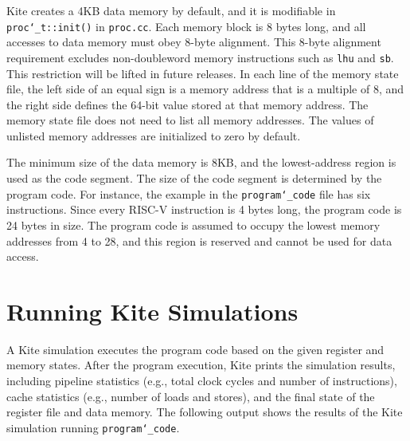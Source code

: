 \documentclass[10pt]{article}
\begin{document}
Kite creates a 4KB data memory by default, and it is modifiable in {\tt\small proc\char`_t::init()} in {\tt\small proc.cc}.
Each memory block is 8 bytes long, and all accesses to data memory must obey 8-byte alignment.
This 8-byte alignment requirement excludes non-doubleword memory instructions such as {\tt\small lhu} and {\tt\small sb}.
This restriction will be lifted in future releases.
In each line of the memory state file, the left side of an equal sign is a memory address that is a multiple of 8, and the right side defines the 64-bit value stored at that memory address.
The memory state file does not need to list all memory addresses.
The values of unlisted memory addresses are initialized to zero by default.

The minimum size of the data memory is 8KB, and the lowest-address region is used as the code segment.
The size of the code segment is determined by the program code.
For instance, the example in the {\tt\small program\char`_code} file has six instructions.
Since every RISC-V instruction is 4 bytes long, the program code is 24 bytes in size.
The program code is assumed to occupy the lowest memory addresses from 4 to 28, and this region is reserved and cannot be used for data access.


\section{Running Kite Simulations} \label{sec:running}
A Kite simulation executes the program code based on the given register and memory states.
After the program execution, Kite prints the simulation results, including pipeline statistics (e.g., total clock cycles and number of instructions), cache statistics (e.g., number of loads and stores), and the final state of the register file and data memory.
The following output shows the results of the Kite simulation running {\tt\small program\char`_code}.
\end{document}
